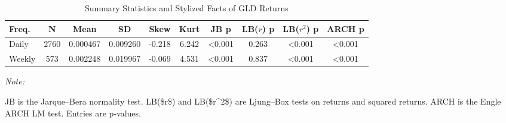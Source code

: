 \begin{table}[!h]
\centering
\caption{\label{tab:tab:returns}Summary Statistics and Stylized Facts of GLD Returns}
\centering
\begin{threeparttable}
\begin{tabular}[t]{lccccccccc}
\toprule
Freq. & N & Mean & SD & Skew & Kurt & JB p & LB($r$) p & LB($r^2$) p & ARCH p\\
\midrule
Daily & 2760 & 0.000467 & 0.009260 & -0.218 & 6.242 & <0.001 & 0.263 & <0.001 & <0.001\\
Weekly & 573 & 0.002248 & 0.019967 & -0.069 & 4.531 & <0.001 & 0.837 & <0.001 & <0.001\\
\bottomrule
\end{tabular}
\begin{tablenotes}
\item \textit{Note: } 
\item JB is the Jarque--Bera normality test. LB(\$r\$) and LB(\$r\textasciicircum{}2\$) are Ljung--Box tests on returns and squared returns. ARCH is the Engle ARCH LM test. Entries are p-values.
\end{tablenotes}
\end{threeparttable}
\end{table}
